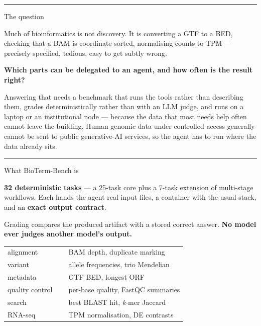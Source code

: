\documentclass[final]{article}
\newcommand{\sz}[2]{\fontsize{#1}{#2}\selectfont}
\newcommand{\body}{\sz{21}{29}}
\newcommand{\bodysm}{\sz{18.5}{25}}
\newcommand{\arr}{\,\textrightarrow\,}
\newcommand{\cardhead}[2][btblue]{%
  {\color{#1}\rule{22mm}{2mm}}\par\vspace{4.5mm}%
  {\dsp\bfseries\sz{35}{43}\color{btink}\raggedright\hyphenpenalty=10000
   \exhyphenpenalty=10000 #2\par}\vspace{6.5mm}%
}
\newcommand{\lead}[1]{{\dsp\bfseries\color{btink}#1}}
\newlength{\colh}\setlength{\colh}{729mm}
\newenvironment{poscol}[1]
  {\begin{minipage}[t][\colh][s]{#1}\vspace{0pt}\raggedright}
  {\vspace{0pt}\end{minipage}}
\newcommand{\cardgap}{\vfill}
\begin{document}
\vspace{11mm}

\newlength{\colw}\setlength{\colw}{0.3153\linewidth}

\begin{poscol}{\colw}

\begin{tcolorbox}[card]
  \cardhead{The question}
  {\body
  Much of bioinformatics is not discovery. It is converting a GTF to a BED,
  checking that a BAM is coordinate-sorted, normalising counts to TPM ---
  precisely specified, tedious, easy to get subtly wrong.\par
  \vspace{5mm}
  \lead{Which parts can be delegated to an agent, and how often is the
  result right?}\par
  \vspace{5mm}
  Answering that needs a benchmark that runs the tools rather than describing
  them, grades deterministically rather than with an LLM judge, and runs on a
  laptop or an institutional node --- because the data that most needs help
  often cannot leave the building. Human genomic data under controlled access
  generally cannot be sent to public generative-AI services, so the agent has
  to run where the data already sits.\par}
\end{tcolorbox}

\cardgap

\begin{tcolorbox}[card]
  \cardhead[btviolet]{What BioTerm-Bench is}
  {\body
  \textbf{32 deterministic tasks} --- a 25-task core plus a 7-task extension of
  multi-stage workflows. Each hands the agent real input files, a container
  with the usual stack, and an \textbf{exact output contract}.\par
  \vspace{5mm}
  Grading compares the produced artifact with a stored correct answer.
  \lead{No model ever judges another model's output.}\par}
  \vspace{8mm}

  {\bodysm
  \setlength{\tabcolsep}{0pt}\renewcommand{\arraystretch}{1.42}
  \begin{tabular}{@{}p{0.34\linewidth}p{0.66\linewidth}@{}}
    \toprule
    alignment       & BAM depth, duplicate marking     \\
    variant         & allele frequencies, trio Mendelian \\
    metadata        & GTF\arr BED, longest ORF          \\
    quality control & per-base quality, FastQC summaries \\
    search          & best BLAST hit, \emph{k}-mer Jaccard \\
    RNA-seq         & TPM normalisation, DE contrasts   \\
    \bottomrule
  \end{tabular}\par}
  \vspace{8mm}


\end{tcolorbox}
\end{poscol}
\end{document}
